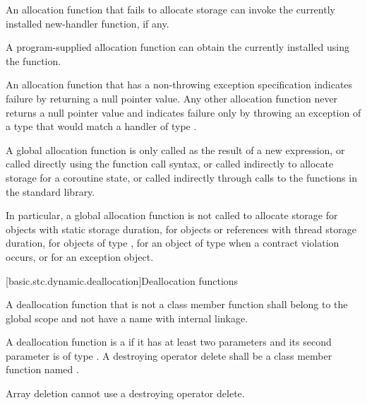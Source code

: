 \pnum
An allocation function that fails to allocate storage can invoke the
currently installed new-handler function, if any.
\begin{note}
%
A program-supplied allocation function can obtain the
currently installed  using the
 function.
\end{note}
An allocation function that has a non-throwing
exception specification
indicates failure by returning
a null pointer value.
Any other allocation function
never returns a null pointer value and
indicates failure only by throwing an exception of a type
that would match a handler of type
.

\pnum
A global allocation function is only called as the result of a new
expression, or called directly using the function call
syntax, or called indirectly to allocate storage for
a coroutine state,
or called indirectly through calls to the
functions in the \Cpp{} standard library.
\begin{note}
In particular, a
global allocation function is not called to allocate storage
for objects with static storage duration,
for objects or references with thread storage duration,
for objects of type ,
for an object of type 
when a contract violation occurs, or
for an exception object.
\end{note}

[basic.stc.dynamic.deallocation]{Deallocation functions}

\pnum
{}%
A deallocation function that is not a class member function
shall belong to the global scope and not have a name with internal linkage.

\pnum
A deallocation function
is a 
if it has at least two parameters
and its second parameter
is of type .
A destroying operator delete
shall be a class member function named .
\begin{note}
Array deletion cannot use a destroying operator delete.
\end{note}

